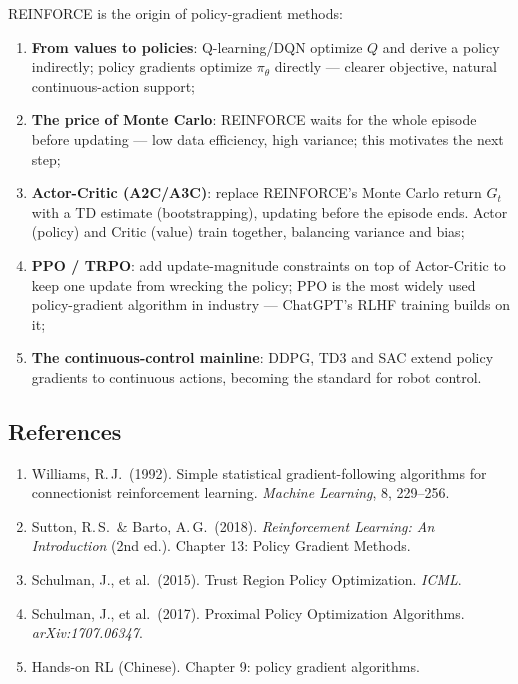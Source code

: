 \documentclass{article}
\begin{document}
REINFORCE is the origin of policy-gradient methods:

\begin{enumerate}
  \item \textbf{From values to policies}: Q-learning/DQN optimize $Q$ and derive a policy indirectly; policy gradients optimize $\pi_\theta$ directly --- clearer objective, natural continuous-action support;
  \item \textbf{The price of Monte Carlo}: REINFORCE waits for the whole episode before updating --- low data efficiency, high variance; this motivates the next step;
  \item \textbf{Actor-Critic (A2C/A3C)}: replace REINFORCE's Monte Carlo return $G_t$ with a TD estimate (bootstrapping), updating before the episode ends. Actor (policy) and Critic (value) train together, balancing variance and bias;
  \item \textbf{PPO / TRPO}: add update-magnitude constraints on top of Actor-Critic to keep one update from wrecking the policy; PPO is the most widely used policy-gradient algorithm in industry --- ChatGPT's RLHF training builds on it;
  \item \textbf{The continuous-control mainline}: DDPG, TD3 and SAC extend policy gradients to continuous actions, becoming the standard for robot control.
\end{enumerate}

\subsection*{References}

\begin{enumerate}
  \item Williams, R.\,J.\ (1992). Simple statistical gradient-following algorithms for connectionist reinforcement learning. \textit{Machine Learning}, 8, 229--256.
  \item Sutton, R.\,S.\ \& Barto, A.\,G.\ (2018). \textit{Reinforcement Learning: An Introduction} (2nd ed.). Chapter 13: Policy Gradient Methods.
  \item Schulman, J., et al.\ (2015). Trust Region Policy Optimization. \textit{ICML}.
  \item Schulman, J., et al.\ (2017). Proximal Policy Optimization Algorithms. \textit{arXiv:1707.06347}.
  \item Hands-on RL (Chinese). Chapter 9: policy gradient algorithms.
\end{enumerate}
\end{document}
